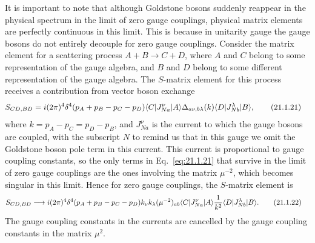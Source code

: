 It is important to note that although Goldstone bosons suddenly reappear in
the physical spectrum in the limit of zero gauge couplings, physical matrix
elements are perfectly continuous in this limit. This is because in
unitarity gauge the gauge bosons do not entirely decouple for zero gauge
couplings. Consider the matrix element for a scattering process
$A+B\to C+D$, where $A$ and $C$ belong to some representation of the gauge
algebra, and $B$ and $D$ belong to some different representation of the
gauge algebra. The $S$-matrix element for this process receives a
contribution from vector boson exchange
\begin{align}
 S_{CD,BD}={}&i(2\pi)^4
 \delta^4(p_A+p_B-p_C-p_D)
 \langle C\rvert J_{Na}^{\nu}\lvert A\rangle
 \Delta_{a\nu,b\lambda}(k)
 \langle D\rvert J_{Nb}^{\lambda}\lvert B\rangle,
 \tag{21.1.21}\label{eq:21.1.21}
\end{align}
where $k=p_A-p_C=p_D-p_B$, and $J_{Na}^{\nu}$ is the current to which
the gauge bosons are coupled, with the subscript $N$ to remind us that in
this gauge we omit the Goldstone boson pole term in this current. This
current is proportional to gauge coupling constants, so the only terms in
Eq.~\eqref{eq:21.1.21} that survive in the limit of zero gauge couplings are
the ones involving the matrix $\mu^{-2}$, which becomes singular in this
limit. Hence for zero gauge couplings, the $S$-matrix element is
\begin{align}
 S_{CD,BD}\longrightarrow{}&
 i(2\pi)^4\delta^4(p_A+p_B-p_C-p_D)
 k_\nu k_\lambda(\mu^{-2})_{ab}
 \langle C\rvert J_{Na}^{\nu}\lvert A\rangle
 \frac1{k^2}
 \langle D\rvert J_{Nb}^{\lambda}\lvert B\rangle.
 \tag{21.1.22}\label{eq:21.1.22}
\end{align}
The gauge coupling constants in the currents are cancelled by the gauge
coupling constants in the matrix $\mu^2$.

